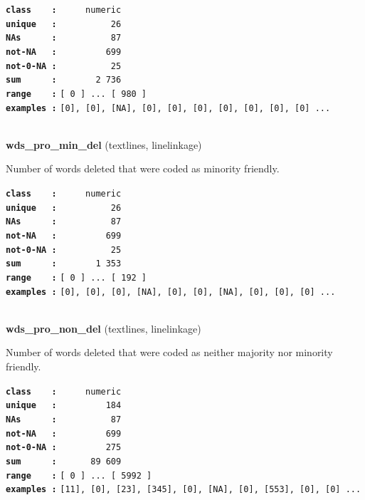 \documentclass[]{article}
\begin{document}
\textbf{\texttt{class\ \ \ \ :}} \texttt{~~~~~numeric}\\
\textbf{\texttt{unique\ \ \ :}} \texttt{~~~~~~~~~~26}\\
\textbf{\texttt{NAs\ \ \ \ \ \ :}} \texttt{~~~~~~~~~~87}\\
\textbf{\texttt{not-NA\ \ \ :}} \texttt{~~~~~~~~~699}\\
\textbf{\texttt{not-0-NA\ :}} \texttt{~~~~~~~~~~25}\\
\textbf{\texttt{sum\ \ \ \ \ \ :}} \texttt{~~~~~~~2~736}\\
\textbf{\texttt{range\ \ \ \ :}}
\texttt{{[}\ 0\ {]}\ ...\ {[}\ 980\ {]}}\\
\textbf{\texttt{examples\ :}}
\texttt{{[}0{]},\ {[}0{]},\ {[}NA{]},\ {[}0{]},\ {[}0{]},\ {[}0{]},\ {[}0{]},\ {[}0{]},\ {[}0{]},\ {[}0{]}\ ...}\\

~

\textbf{wds\_pro\_min\_del} (textlines, linelinkage)

Number of words deleted that were coded as minority friendly.

\textbf{\texttt{class\ \ \ \ :}} \texttt{~~~~~numeric}\\
\textbf{\texttt{unique\ \ \ :}} \texttt{~~~~~~~~~~26}\\
\textbf{\texttt{NAs\ \ \ \ \ \ :}} \texttt{~~~~~~~~~~87}\\
\textbf{\texttt{not-NA\ \ \ :}} \texttt{~~~~~~~~~699}\\
\textbf{\texttt{not-0-NA\ :}} \texttt{~~~~~~~~~~25}\\
\textbf{\texttt{sum\ \ \ \ \ \ :}} \texttt{~~~~~~~1~353}\\
\textbf{\texttt{range\ \ \ \ :}}
\texttt{{[}\ 0\ {]}\ ...\ {[}\ 192\ {]}}\\
\textbf{\texttt{examples\ :}}
\texttt{{[}0{]},\ {[}0{]},\ {[}0{]},\ {[}NA{]},\ {[}0{]},\ {[}0{]},\ {[}NA{]},\ {[}0{]},\ {[}0{]},\ {[}0{]}\ ...}\\

~

\textbf{wds\_pro\_non\_del} (textlines, linelinkage)

Number of words deleted that were coded as neither majority nor minority
friendly.

\textbf{\texttt{class\ \ \ \ :}} \texttt{~~~~~numeric}\\
\textbf{\texttt{unique\ \ \ :}} \texttt{~~~~~~~~~184}\\
\textbf{\texttt{NAs\ \ \ \ \ \ :}} \texttt{~~~~~~~~~~87}\\
\textbf{\texttt{not-NA\ \ \ :}} \texttt{~~~~~~~~~699}\\
\textbf{\texttt{not-0-NA\ :}} \texttt{~~~~~~~~~275}\\
\textbf{\texttt{sum\ \ \ \ \ \ :}} \texttt{~~~~~~89~609}\\
\textbf{\texttt{range\ \ \ \ :}}
\texttt{{[}\ 0\ {]}\ ...\ {[}\ 5992\ {]}}\\
\textbf{\texttt{examples\ :}}
\texttt{{[}11{]},\ {[}0{]},\ {[}23{]},\ {[}345{]},\ {[}0{]},\ {[}NA{]},\ {[}0{]},\ {[}553{]},\ {[}0{]},\ {[}0{]}\ ...}\\
\end{document}
